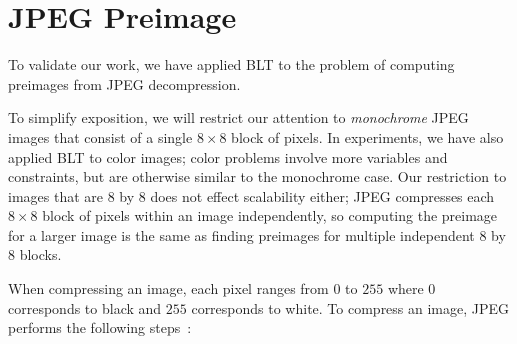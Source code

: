 \section{JPEG Preimage}
\label{sec:jpeg}


To validate our work, we have applied BLT to the problem of
computing preimages from JPEG decompression.

To simplify exposition, we will restrict our attention to
\emph{monochrome} JPEG images that consist of a single
$8\times{}8$ block of pixels.
%
In experiments, we have also applied BLT to color images; color
problems involve more variables and constraints, but are otherwise similar
to the monochrome case.
%
Our restriction to images that are $8$ by $8$ does not effect
scalability either; JPEG compresses each $8\times{}8$ block of
pixels within an image independently, so computing the preimage
for a larger image is the same as finding preimages for multiple
independent $8$ by $8$ blocks.

When compressing an image, each pixel ranges from
$0$ to $255$ where $0$ corresponds to black and $255$ corresponds to white.
To compress an image, JPEG performs the following steps~\cite{jpeg}:

\newcommand{\dct}{\mathrm{dct}_2}
\newcommand{\idct}{\mathrm{idct}_2}

